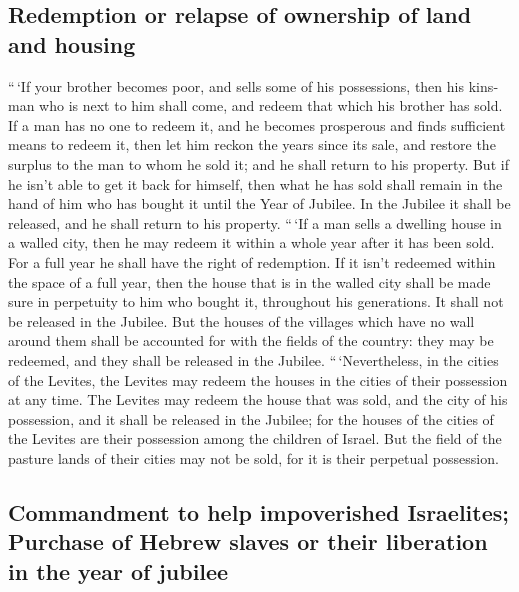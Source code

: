 \begin{paracol}{2}
\begin{otherlanguage}{english}
\hypertarget{redemption-or-relapse-of-ownership-of-land-and-housing}{%
\subsection{Redemption or relapse of ownership of land and
housing}\label{redemption-or-relapse-of-ownership-of-land-and-housing}}

 ``\,`If your brother becomes poor, and sells some of his
possessions, then his kinsman who is next to him shall come, and redeem
that which his brother has sold.  If a man has no one to
redeem it, and he becomes prosperous and finds sufficient means to
redeem it,  then let him reckon the years since its sale,
and restore the surplus to the man to whom he sold it; and he shall
return to his property.  But if he isn't able to get it
back for himself, then what he has sold shall remain in the hand of him
who has bought it until the Year of Jubilee. In the Jubilee it shall be
released, and he shall return to his property.  ``\,`If a
man sells a dwelling house in a walled city, then he may redeem it
within a whole year after it has been sold. For a full year he shall
have the right of redemption.  If it isn't redeemed
within the space of a full year, then the house that is in the walled
city shall be made sure in perpetuity to him who bought it, throughout
his generations. It shall not be released in the Jubilee.
 But the houses of the villages which have no wall around
them shall be accounted for with the fields of the country: they may be
redeemed, and they shall be released in the Jubilee. 
``\,`Nevertheless, in the cities of the Levites, the Levites may redeem
the houses in the cities of their possession at any time.
 The Levites may redeem the house that was sold, and the
city of his possession, and it shall be released in the Jubilee; for the
houses of the cities of the Levites are their possession among the
children of Israel.  But the field of the pasture lands
of their cities may not be sold, for it is their perpetual possession.

\hypertarget{commandment-to-help-impoverished-israelites-purchase-of-hebrew-slaves-or-their-liberation-in-the-year-of-jubilee}{%
\subsection{Commandment to help impoverished Israelites; Purchase of
Hebrew slaves or their liberation in the year of
jubilee}\label{commandment-to-help-impoverished-israelites-purchase-of-hebrew-slaves-or-their-liberation-in-the-year-of-jubilee}}


\end{otherlanguage}
\end{paracol}
